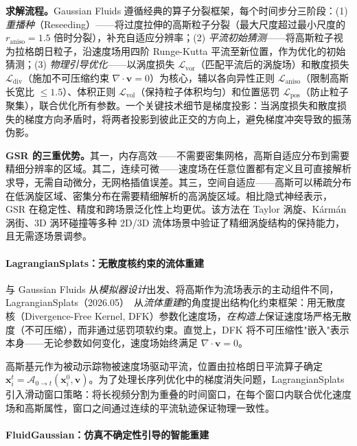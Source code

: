 \textbf{求解流程。}Gaussian Fluids 遵循经典的算子分裂框架，每个时间步分三阶段：(1) \emph{重播种}（Reseeding）——将过度拉伸的高斯粒子分裂（最大尺度超过最小尺度的 $r_\mathrm{aniso}=1.5$ 倍时分裂），补充自适应分辨率；(2) \emph{平流初始猜测}——将高斯粒子视为拉格朗日粒子，沿速度场用四阶 Runge-Kutta 平流至新位置，作为优化的初始猜测；(3) \emph{物理引导优化}——以涡度损失 $\mathcal{L}_\mathrm{vor}$（匹配平流后的涡旋场）和散度损失 $\mathcal{L}_\mathrm{div}$（施加不可压缩约束 $\nabla \cdot \mathbf{v} = 0$）为核心，辅以各向异性正则 $\mathcal{L}_\mathrm{aniso}$（限制高斯长宽比 $\leq 1.5$）、体积正则 $\mathcal{L}_\mathrm{vol}$（保持粒子体积均匀）和位置惩罚 $\mathcal{L}_\mathrm{pos}$（防止粒子聚集），联合优化所有参数。一个关键技术细节是梯度投影：当涡度损失和散度损失的梯度方向矛盾时，将两者投影到彼此正交的方向上，避免梯度冲突导致的振荡伪影。

\textbf{GSR 的三重优势。}其一，内存高效——不需要密集网格，高斯自适应分布到需要精细分辨率的区域。其二，连续可微——速度场在任意位置都有定义且可直接解析求导，无需自动微分，无网格插值误差。其三，空间自适应——高斯可以稀疏分布在低涡旋区域、密集分布在需要精细解析的高涡旋区域。相比隐式神经表示，GSR 在稳定性、精度和跨场景泛化性上均更优。该方法在 Taylor 涡旋、Kármán 涡街、3D 涡环碰撞等多种 2D/3D 流体场景中验证了精细涡旋结构的保持能力，且无需逐场景调参。

\paragraph{LagrangianSplats：无散度核约束的流体重建}

与 Gaussian Fluids 从\emph{模拟器设计}出发、将高斯作为流场表示的主动组件不同，LagrangianSplats（2026.05）~\cite{2605_09299}从\emph{流体重建}的角度提出结构化约束框架：用无散度核（Divergence-Free Kernel, DFK）参数化速度场，\emph{在构造上}保证速度场严格无散度（不可压缩），而非通过惩罚项软约束。直觉上，DFK 将不可压缩性"嵌入"表示本身——无论参数如何变化，速度场始终满足 $\nabla \cdot \mathbf{v} = 0$。

高斯基元作为被动示踪物被速度场驱动平流，位置由拉格朗日平流算子确定 $\mathbf{x}_i^t = \mathcal{A}_{0 \to t}(\mathbf{x}_i^0, \mathbf{v})$。为了处理长序列优化中的梯度消失问题，LagrangianSplats 引入滑动窗口策略：将长视频分割为重叠的时间窗口，在每个窗口内联合优化速度场和高斯属性，窗口之间通过连续的平流轨迹保证物理一致性。

\paragraph{FluidGaussian：仿真不确定性引导的智能重建}

